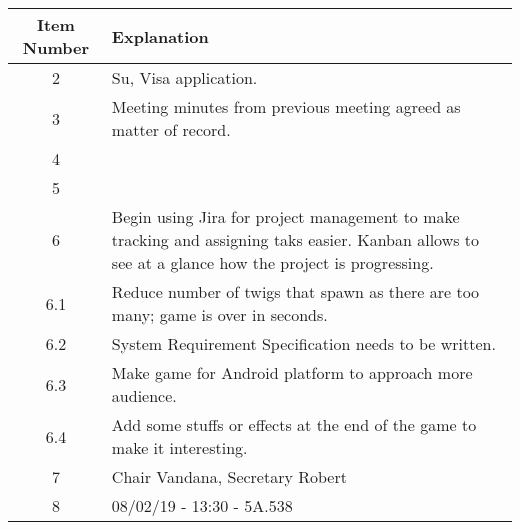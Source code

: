 \documentclass{article}
\begin{document}
\begin{table}[H]
	\centering
	\begin{tabular}{| c | p{9cm} |}
		\hline
		Item Number & Explanation \\ \hline
		2 & Su, Visa application.\\ \hline
		3 & Meeting minutes from previous meeting agreed as matter of record. \\ \hline
		4 & \\ \hline
		5 & \\ \hline
		6 & Begin using Jira for project management to make tracking and assigning taks easier. Kanban allows to see at a glance how the project is progressing.\\ \hline
		6.1 & Reduce number of twigs that spawn as there are too many; game is over in seconds. \\ \hline
		6.2 & System Requirement Specification needs to be written.\\ \hline
		6.3 & Make game for Android platform to approach more audience.\\ \hline
		6.4 & Add some stuffs or effects at the end of the game to make it interesting.\\ \hline
		7 & Chair Vandana, Secretary Robert\\ \hline
		8 & 08/02/19 - 13:30 - 5A.538   \\ \hline

		
	\end{tabular}
\end{table}
\end{document}
